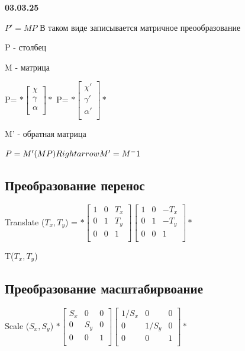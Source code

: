\documentclass{article}
\begin{document}
\textbf{03.03.25}


$P'= MP$ В таком виде записывается матричное преообразование

P - столбец

M - матрица

P=
$*\begin{bmatrix}
    \chi \\
    \gamma  \\ 
    \alpha  \\

\end{bmatrix}*$
P=
$*\begin{bmatrix}
    \chi' \\
    \gamma ' \\ 
    \alpha ' \\

\end{bmatrix}*$


M' - обратная матрица


$P=M'(MP) \\Rightarrow  M'=M^-1$


\subsection{Преобразование перенос}


Translate ($T_x, T_y$) = 
$*\begin{bmatrix}
    1 & 0  & T_x \\[0.3em]
    0 & 1  & T_y \\[0.3em]
    0 & 0  & 1 \\[0.3em]
\end{bmatrix}
\begin{bmatrix}
    1 & 0  & -T_x \\[0.3em]
    0 & 1  & -T_y \\[0.3em]
    0 & 0  & 1 \\[0.3em]
\end{bmatrix}*$


T($T_x,T_y$)


\subsection{Преобразование масштабирвоание}

Scale ($S_x,S_y$) 
$*\begin{bmatrix}
    S_x & 0  & 0 \\[0.3em]
    0 & S_y  & 0 \\[0.3em]
    0 & 0  & 1 \\[0.3em]
\end{bmatrix}
\begin{bmatrix}
    1/S_x & 0  & 0 \\[0.3em]
    0 & 1/S_y  & 0 \\[0.3em]
    0 & 0  & 1 \\[0.3em]
\end{bmatrix}*$
\end{document}
